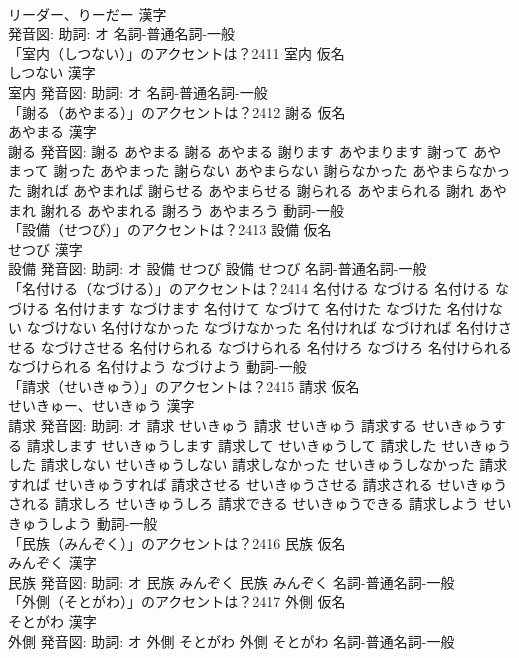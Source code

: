 \documentclass[8pt]{extreport}
\begin{document}
\begin{CJK}{UTF8}{min}
\\	リーダー、りーだー 漢字　
\\	発音図: 助詞: オ							名詞-普通名詞-一般 
\\	「室内（しつない）」のアクセントは？2411	室内 仮名　
\\	しつない 漢字　
\\	室内 発音図: 助詞: オ							名詞-普通名詞-一般 
\\	「謝る（あやまる）」のアクセントは？2412	謝る 仮名　
\\	あやまる 漢字　
\\	謝る 発音図:	謝る あやまる		謝る あやまる 謝ります あやまります 謝って あやまって 謝った あやまった 謝らない あやまらない 謝らなかった あやまらなかった 謝れば あやまれば 謝らせる あやまらせる 謝られる あやまられる 謝れ あやまれ 謝れる あやまれる 謝ろう あやまろう				動詞-一般 
\\	「設備（せつび）」のアクセントは？2413	設備 仮名　
\\	せつび 漢字　
\\	設備 発音図: 助詞: オ	設備 せつび		設備 せつび				名詞-普通名詞-一般 
\\	「名付ける（なづける）」のアクセントは？2414		名付ける なづける		名付ける なづける 名付けます なづけます 名付けて なづけて 名付けた なづけた 名付けない なづけない 名付けなかった なづけなかった 名付ければ なづければ 名付けさせる なづけさせる 名付けられる なづけられる 名付けろ なづけろ 名付けられる なづけられる 名付けよう なづけよう				動詞-一般 
\\	「請求（せいきゅう）」のアクセントは？2415	請求 仮名　
\\	せいきゅー、せいきゅう 漢字　
\\	請求 発音図: 助詞: オ	請求 せいきゅう		請求 せいきゅう 請求する せいきゅうする 請求します せいきゅうします 請求して せいきゅうして 請求した せいきゅうした 請求しない せいきゅうしない 請求しなかった せいきゅうしなかった 請求すれば せいきゅうすれば 請求させる せいきゅうさせる 請求される せいきゅうされる 請求しろ せいきゅうしろ 請求できる せいきゅうできる 請求しよう せいきゅうしよう				動詞-一般 
\\	「民族（みんぞく）」のアクセントは？2416	民族 仮名　
\\	みんぞく 漢字　
\\	民族 発音図: 助詞: オ	民族 みんぞく		民族 みんぞく				名詞-普通名詞-一般 
\\	「外側（そとがわ）」のアクセントは？2417	外側 仮名　
\\	そとがわ 漢字　
\\	外側 発音図: 助詞: オ	外側 そとがわ		外側 そとがわ				名詞-普通名詞-一般 

\end{CJK}
\end{document}
